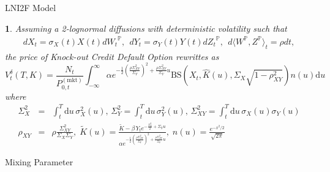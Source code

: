 \documentclass[serif]{beamer}
\newtheorem{proposition}[theorem]{\translate{Proposition}}
\numberwithin{equation}{section}
\newcommand\du{\mathrm{d}u\,}
\begin{document}
\begin{frame}{LNI2F Model}
\begin{proposition}
\small{
Assuming a 2-lognormal diffusions with deterministic volatility such that
\begin{eqnarray*}
       dX_t  = \sigma_X(t)X(t)d{W_t}^{\mathbb P}, ~~ dY_t  = \sigma_Y(t)Y(t)d{Z_t}^{\mathbb P}, ~~ d\langle {W}^{\mathbb P},{Z}^{\mathbb P}\rangle_t =\rho dt,
 \end{eqnarray*}
 the price of Knock-out Credit Default Option rewrittes as
\begin{equation*} \label{eq::CDSoptionFormula}
V_t^{\delta}(T,K) = \frac{N_t}{P^{(\mathrm{mkt})}_{0,t}}\int_{-\infty}^{\infty} \alpha e^{-\frac{1}{2}\left(\frac{\rho \Sigma_{XY}^2}{\Sigma_Y}\right)^2+\frac{\rho \Sigma_{XY}^2}{\Sigma_Y} u} \mathrm{BS}\left(X_t,\hat K(u), \Sigma_X \sqrt{1-\rho_{XY}^2}\right) n(u){\du}
\end{equation*}
where
\begin{eqnarray*}
\Sigma_X^2 &=& \int_t^{T}{\du \sigma_X^2(u)},\,
\Sigma_Y^2 = \int_t^{T}{\du \sigma_Y^2(u)}, \,
\Sigma_{XY}^2 = \int_t^{T}{\du \sigma_X(u) \sigma_Y(u)} \\
\rho_{XY} &=&\rho \frac{ \Sigma_{XY}^2}{\Sigma_X \Sigma_Y},\;
\tilde K(u) = \frac{\tilde K -\beta \, Y_t e^{-\frac{\Sigma_Y^2}{2}+\Sigma_Y u}} {\alpha e^{-\frac{1}{2}\left(\frac{\rho \Sigma_{XY}^2}{\Sigma_Y}\right)^2+\frac{\rho \Sigma_{XY}^2}{\Sigma_Y} u}} , \;
n(u) = \frac{e^{-x^2/2}}{\sqrt{2\pi}}
\end{eqnarray*}
}
\end{proposition}



\end{frame}


\begin{frame}{Mixing Parameter}


\end{frame}
\end{document}
